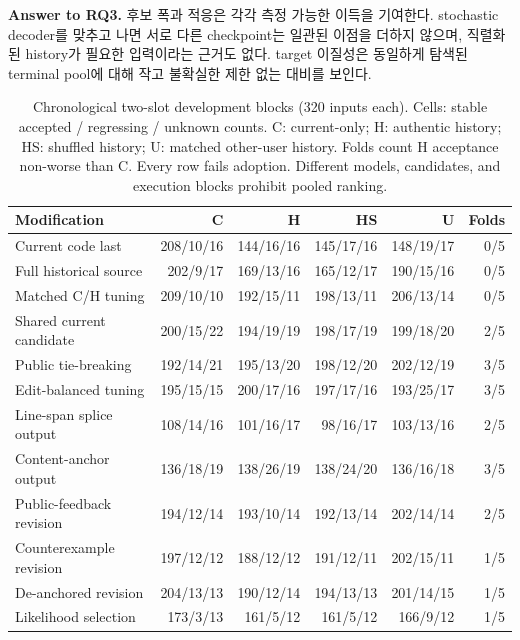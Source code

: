 \documentclass[10pt,conference]{IEEEtran}
\begin{document}
\noindent\textbf{Answer to RQ3.} 후보 폭과 적응은 각각 측정 가능한 이득을 기여한다. stochastic decoder를 맞추고 나면 서로 다른 checkpoint는 일관된 이점을 더하지 않으며, 직렬화된 history가 필요한 입력이라는 근거도 없다. target 이질성은 동일하게 탐색된 terminal pool에 대해 작고 불확실한 제한 없는 대비를 보인다.

\begin{table}[t]
\caption{Chronological two-slot development blocks (320 inputs each). Cells: stable accepted / regressing / unknown counts. C: current-only; H: authentic history; HS: shuffled history; U: matched other-user history. Folds count H acceptance non-worse than C. Every row fails adoption. Different models, candidates, and execution blocks prohibit pooled ranking.}
\label{tab:development}
\centering\scriptsize\setlength{\tabcolsep}{2pt}
\begin{tabular}{l||rrrr|r}
\toprule
Modification & C & H & HS & U & Folds \\
\midrule
Current code last & 208/10/16 & 144/16/16 & 145/17/16 & 148/19/17 & 0/5 \\
Full historical source & 202/9/17 & 169/13/16 & 165/12/17 & 190/15/16 & 0/5 \\
Matched C/H tuning & 209/10/10 & 192/15/11 & 198/13/11 & 206/13/14 & 0/5 \\
Shared current candidate & 200/15/22 & 194/19/19 & 198/17/19 & 199/18/20 & 2/5 \\
Public tie-breaking & 192/14/21 & 195/13/20 & 198/12/20 & 202/12/19 & 3/5 \\
Edit-balanced tuning & 195/15/15 & 200/17/16 & 197/17/16 & 193/25/17 & 3/5 \\
Line-span splice output & 108/14/16 & 101/16/17 & 98/16/17 & 103/13/16 & 2/5 \\
Content-anchor output & 136/18/19 & 138/26/19 & 138/24/20 & 136/16/18 & 3/5 \\
Public-feedback revision & 194/12/14 & 193/10/14 & 192/13/14 & 202/14/14 & 2/5 \\
Counterexample revision & 197/12/12 & 188/12/12 & 191/12/11 & 202/15/11 & 1/5 \\
De-anchored revision & 204/13/13 & 190/12/14 & 194/13/13 & 201/14/15 & 1/5 \\
Likelihood selection & 173/3/13 & 161/5/12 & 161/5/12 & 166/9/12 & 1/5 \\
\bottomrule
\end{tabular}
\end{table}
\end{document}
